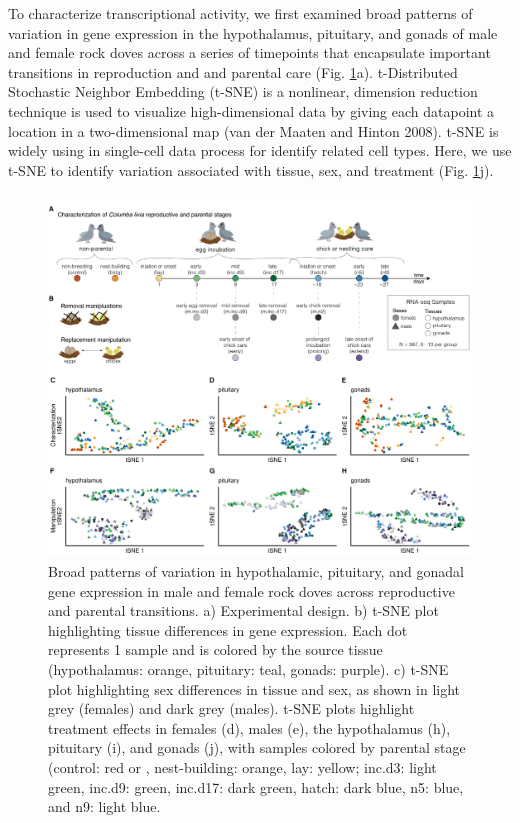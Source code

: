 To characterize transcriptional activity, we first examined broad
patterns of variation in gene expression in the hypothalamus, pituitary,
and gonads of male and female rock doves across a series of timepoints
that encapsulate important transitions in reproduction and and parental
care (Fig. \ref{figure:fig1}a). t-Distributed Stochastic Neighbor
Embedding (t-SNE) is a nonlinear, dimension reduction technique is used
to visualize high-dimensional data by giving each datapoint a location
in a two-dimensional map (van der Maaten and Hinton 2008). t-SNE is
widely using in single-cell data process for identify related cell
types. Here, we use t-SNE to identify variation associated with tissue,
sex, and treatment (Fig. \ref{figure:fig1}j).

\begin{figure}[h]
  \centering
  \includegraphics[width=1.0\textwidth]{../../figures/fig1-1}
  \caption{Broad patterns of variation in hypothalamic, pituitary, and gonadal gene expression in male and female rock doves across reproductive and parental transitions. a) Experimental design. b) t-SNE plot highlighting tissue differences in gene expression. Each dot represents 1 sample and is colored by the source tissue (hypothalamus: orange, pituitary: teal, gonads: purple). c) t-SNE plot highlighting sex differences in tissue and sex, as shown in light grey (females) and dark grey (males). t-SNE plots highlight treatment effects in females (d), males (e), the hypothalamus (h), pituitary (i), and gonads (j), with samples colored by parental stage (control: red or , nest-building: orange, lay: yellow; inc.d3: light green, inc.d9: green, inc.d17: dark green, hatch: dark blue, n5: blue, and n9: light blue.}
  \label{figure:fig1}
\end{figure}

